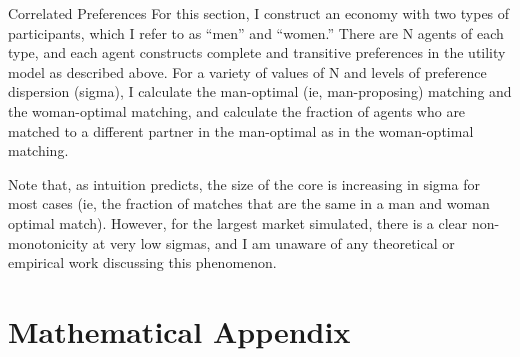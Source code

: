 \documentclass[WP]{AEA}
\begin{document}
Correlated Preferences
For this section, I construct an economy with two types of participants, which I refer to as “men” and “women.”  There are N agents of each type, and each agent constructs complete and transitive preferences in the utility model as described above.  For a variety of values of N and levels of preference dispersion (sigma), I calculate the man-optimal (ie, man-proposing) matching and the woman-optimal matching, and calculate the fraction of agents who are matched to a different partner in the man-optimal as in the woman-optimal matching. 



Note that, as intuition predicts, the size of the core is increasing in sigma for most cases  (ie, the fraction of matches that are the same in a man and woman optimal match). However, for the largest market simulated, there is a clear non-monotonicity at very low sigmas, and I am unaware of any theoretical or empirical work discussing this phenomenon.














\appendix

\section{Mathematical Appendix}
\end{document}
